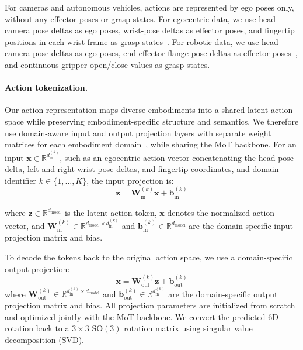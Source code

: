 For cameras and autonomous vehicles, actions are represented by ego poses only, without any effector poses or grasp states. For egocentric data, we use head-camera pose deltas as ego poses, wrist-pose deltas as effector poses, and fingertip positions in each wrist frame as grasp states~\citep{yang2025egovla}. For robotic data, we use head-camera pose deltas as ego poses, end-effector flange-pose deltas as effector poses~\citep{lyu2026lda}, and continuous gripper open/close values as grasp states.



\paragraph{Action tokenization.} Our action representation maps diverse embodiments into a shared latent action space while preserving embodiment-specific structure and semantics.
We therefore use domain-aware input and output projection layers with separate weight matrices for each embodiment domain~\citep{zheng2026xvla}, while sharing the MoT backbone.
For an input $\mathbf{x} \in \mathbb{R}^{d_{\text{in}}^{(k)}}$, such as an egocentric action vector concatenating the head-pose delta, left and right wrist-pose deltas, and fingertip coordinates, and domain identifier $k \in \{1, \ldots, K\}$, the input projection is:
\begin{equation}
    \mathbf{z} = \mathbf{W}_{\mathrm{in}}^{(k)} \mathbf{x} + \mathbf{b}_{\mathrm{in}}^{(k)}
\end{equation}

where $\mathbf{z} \in \mathbb{R}^{d_{\text{model}}}$ is the latent action token, $\mathbf{x}$ denotes the normalized action vector, and $\mathbf{W}_{\mathrm{in}}^{(k)} \in \mathbb{R}^{d_{\text{model}} \times d_{\text{in}}^{(k)}}$ and $\mathbf{b}_{\mathrm{in}}^{(k)} \in \mathbb{R}^{d_{\text{model}}}$ are the domain-specific input projection matrix and bias.

To decode the tokens back to the original action space, we use a domain-specific output projection:
\begin{equation}
    \mathbf{x} = \mathbf{W}_{\mathrm{out}}^{(k)} \mathbf{z} + \mathbf{b}_{\mathrm{out}}^{(k)}
\end{equation}
where $\mathbf{W}_{\mathrm{out}}^{(k)} \in \mathbb{R}^{d_{\text{in}}^{(k)} \times d_{\text{model}}}$ and $\mathbf{b}_{\mathrm{out}}^{(k)} \in \mathbb{R}^{d_{\text{in}}^{(k)}}$ are the domain-specific output projection matrix and bias.
All projection parameters are initialized from scratch and optimized jointly with the MoT backbone.
We convert the predicted 6D rotation back to a $3\times3$ $\mathrm{SO}(3)$ rotation matrix using singular value decomposition (SVD).

